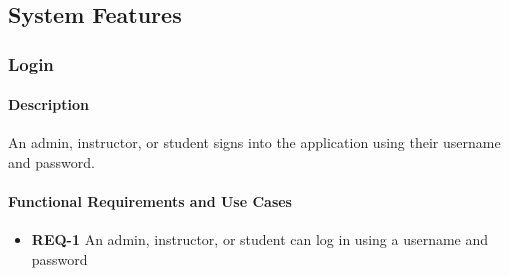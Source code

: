 \documentclass{article}
\begin{document}
\newpage
\subsection{System Features}







\subsubsection{Login}




\paragraph{Description} An admin, instructor, or student signs into the application using their username and password.

\paragraph{Functional Requirements and Use Cases}

\begin{itemize}
  \item \textbf{REQ-1} An admin, instructor, or student can log in using a username and password
\end{itemize}
\end{document}
